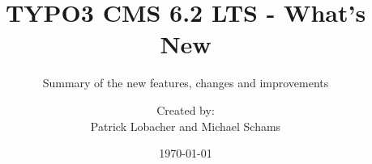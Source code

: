 %

%
%

\documentclass[t]{beamer}

\beamertemplatenavigationsymbolsempty

{
	\usetheme{typo3slides}
}

\title{TYPO3 CMS 6.2 LTS - What's New}
\subtitle{Summary of the new features, changes and improvements}
\author{
	\centerline{Created by:}
	\centerline{Patrick Lobacher and Michael Schams}
}
\date{\today}



\sharefont


\begingroup
	[default]
	\begin{frame}
		\titlepage
	\end{frame}
\endgroup



\section*{TYPO3 CMS 6.2 LTS - What's New}
\begin{frame}[fragile]
	\frametitle{Chapter Overview}
	\framesubtitle{Chapter Overview}

	\begin{multicols}{2}
		\tableofcontents
	\end{multicols}

\end{frame}

